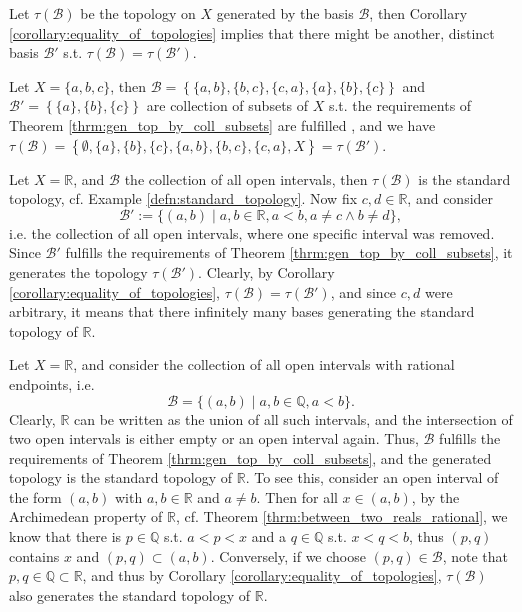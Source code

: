 \begin{remark}
	Let $\tau(\mathscr B)$ be the topology on $X$ generated by the basis $\mathscr B$, then Corollary \ref{corollary:equality_of_topologies} implies that there might be another, distinct basis $\mathscr B'$ s.t. $\tau(\mathscr B) = \tau(\mathscr B')$.
\end{remark}

\begin{exmp}
	Let $X = \{ a, b, c \}$, then $\mathscr B = \left\{ \{a, b\}, \{b, c \}, \{c, a\}, \{a\}, \{b\}, \{c\}\right\}$ and $\mathscr B' = \left\{ \{a\}, \{b\}, \{c\} \right\}$ are collection of subsets of $X$ s.t. the requirements of Theorem \ref{thrm:gen_top_by_coll_subsets} are fulfilled \cite{1333309}, and we have $\tau(\mathscr B) = \left\{ \emptyset, \{a\}, \{b\}, \{c\}, \{a, b\}, \{b, c\}, \{c, a\}, X \right\} = \tau(\mathscr B')$.
\end{exmp}

\begin{exmp}
	Let $X=\mathbb R$, and $\mathscr B$ the collection of all open intervals, then $\tau(\mathscr B)$ is the standard topology, cf. Example \ref{defn:standard_topology}. Now fix $c, d\in\mathbb R$, and consider $$\mathscr B' := \{(a, b) \mid a,b\in\mathbb R, a < b, a\ne c \wedge b\ne d\},$$ i.e. the collection of all open intervals, where one specific interval was removed. Since $\mathscr B'$ fulfills the requirements of Theorem \ref{thrm:gen_top_by_coll_subsets}, it generates the topology $\tau(\mathscr B')$. Clearly, by Corollary \ref{corollary:equality_of_topologies}, $\tau(\mathscr B) = \tau(\mathscr B')$, and since $c, d$ were arbitrary, it means that there infinitely many bases generating the standard topology of $\mathbb R$.
\end{exmp}

\begin{remark}
	Let $X=\mathbb R$, and consider the collection of all open intervals with rational endpoints, i.e. 
	$$\mathscr B = \{(a, b)\mid a, b\in\mathbb Q, a < b\}.$$ Clearly, $\mathbb R$ can be written as the union of all such intervals, and the intersection of two open intervals is either empty or an open interval again. Thus, $\mathscr B$ fulfills the requirements of Theorem \ref{thrm:gen_top_by_coll_subsets}, and the generated topology is the standard topology of $\mathbb R$. To see this, consider an open interval of the form $(a, b)$ with $a, b\in\mathbb R$ and $a\ne b$. Then for all $x\in (a, b)$, by the Archimedean property of $\mathbb R$, cf. Theorem \ref{thrm:between_two_reals_rational}, we know that there is $p\in\mathbb Q$ s.t. $a < p < x$ and a $q\in\mathbb Q$ s.t. $x < q < b$, thus $(p, q)$ contains $x$ and $(p, q) \subset (a, b)$. Conversely, if we choose $(p, q)\in\mathscr B$, note that $p, q\in\mathbb Q\subset \mathbb R$, and thus by Corollary \ref{corollary:equality_of_topologies}, $\tau(\mathscr B)$ also generates the standard topology of $\mathbb R$.
\end{remark}

